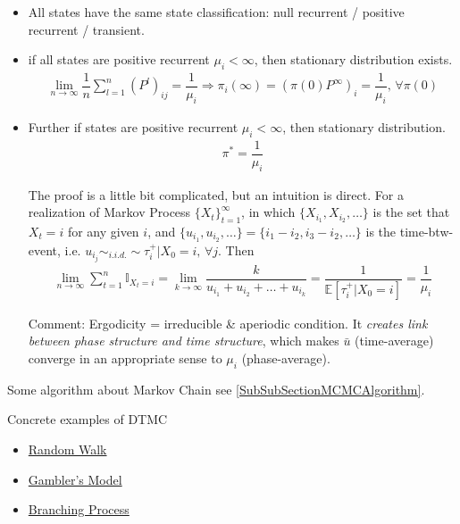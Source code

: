 \begin{itemize}[topsep=2pt,itemsep=0pt]
    \item All states have the same state classification: null recurrent / positive recurrent / transient.
    \item if all states are positive recurrent $ \mu _i<\infty $, then stationary distribution exists.
    \begin{align}
        \lim_{n\to \infty}\dfrac{1}{n}\sum_{l=1}^n(P^l)_{ij}=\dfrac{1}{\mu _i}\Rightarrow \pi_i(\infty)=(\pi(0)P^\infty)_i= \dfrac{1}{\mu _i},\, \forall \pi(0)
    \end{align}
    \item Further if states are positive recurrent $ \mu _i<\infty $, then stationary distribution.
\begin{align}
    \pi^*=\dfrac{1}{\mu _i} 
\end{align}

    The proof is a little bit complicated, but an intuition is direct. For a realization of Markov Process $ \{X_t\}_{t=1}^\infty $, in which $ \{X_{i_1},X_{i_2},\ldots\} $ is the set that $ X_t=i $ for any given $ i $, and $ \{u_{i_1},u_{i_2},\ldots\}=\{i_1-i_2,i_3-i_2,\ldots\} $ is the time-btw-event, i.e. $ u_{i_j}\sim_{i.i.d.} \sim \tau^+_i|X_0=i,\,\forall j$. Then
    \begin{align}
        \lim_{n\to\infty}\sum_{t=1}^n\mathbb{I}_{X_t=i}=\lim_{k\to\infty}\dfrac{k}{u_{i_1}+u_{i_2}+\ldots+u_{i_k}}=\dfrac{1}{\mathbb{E}\left[ \tau_{i}^+|X_0=i \right] }=\dfrac{1}{\mu _i}
    \end{align}

    Comment: Ergodicity = irreducible \& aperiodic condition. It \textit{creates link between phase structure and time structure}, which makes $ \bar{u} $ (time-average) converge in an appropriate sense to $ \mu _i $ (phase-average).
    
    
    
\end{itemize}

Some algorithm about Markov Chain see \autoref{SubSubSectionMCMCAlgorithm}.


\begin{point}
    Concrete examples of DTMC
\end{point}
\begin{itemize}[topsep=2pt,itemsep=0pt]
    \item \hyperlink{RandomWalk}{Random Walk}
    \item \hyperlink{GamblersModel}{Gambler's Model}
    \item \hyperlink{BranchingProcess}{Branching Process}
\end{itemize}






